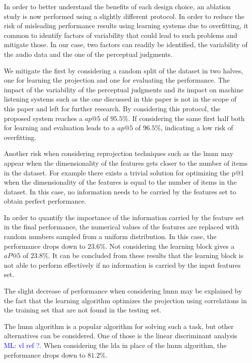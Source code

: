 \documentclass{bmcart}
\newcommand{\ml}[1]{\textcolor{blue}{ML: #1}}
\begin{document}
In order to better understand the benefits of each design choice, an ablation study is now performed using a slightly different protocol. In order to reduce the risk of misleading performance results using learning systems due to overfitting, it common to identify factors of variability that could lead to such problems and mitigate those. In our case, two factors can readily be identified, the variability of the audio data and the one of the perceptual judgments.

We mitigate the first by considering a random split of the dataset in two halves, one for learning the projection and one for evaluating the performance. The impact of the variability of the perceptual judgments and its impact on machine listening systems such as the one discussed in this paper is not in the scope of this paper and left for further research. By considering this protocol, the proposed system reaches a $ap@5$ of $95.5\%$. If considering the same first half both for learning and evaluation leads to a $ap@5$ of $96.5\%$, indicating a low risk of overfitting.

Another risk when considering reprojection techniques such as the lmnn may appear when the dimensionality of the features gets closer to the  number of items in the dataset. For example there exists a trivial solution for optimizing the p@1 when the dimensionality of the features is equal to the number of items in the dataset. In this case, no information needs to be carried by the features set to obtain perfect performance.

In order to quantify the importance of the information carried by the feature set in the final performance, the numerical values of the features are replaced with random numbers sampled from a uniform distribution. In this case, the performance drops down to $23.6\%$. Not considering the learning block gives a $aP@5$ of $23.8\%$. It can be concluded from these results that the learning block is not able to perform effectively if no information is carried by the input features set.

The slight decrease of performance when considering lmnn may be explained by the fact that the learning algorithm optimizes the projection using correlations in the training set that are not found in the testing set.

The lmnn algorithm is a popular algorithm for solving such a task, but other alternatives can be considered. One of those is the linear discriminant analysis \ml{vl ref ?}\cite{}. When considering the lda in place of the lmnn algorithm, the performance drops down to $81.2\%$.
\end{document}
